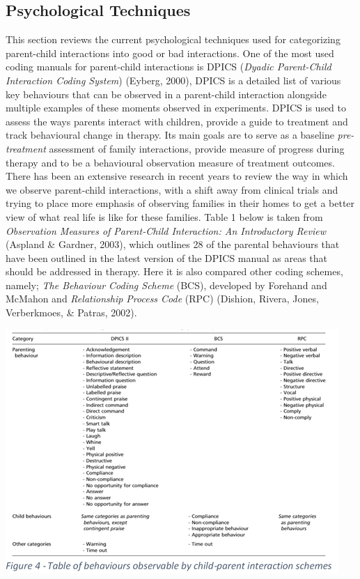 \documentclass[a4paper,11pt]{report}
\begin{document}
\subsection{Psychological Techniques}
This section reviews the current psychological techniques used for categorizing parent-child interactions into good or bad interactions. One of the most used coding manuals for parent-child interactions is DPICS (\textit{Dyadic Parent-Child Interaction Coding System}) (Eyberg, 2000), DPICS is a detailed list of various key behaviours that can be observed in a parent-child interaction alongside multiple examples of these moments observed in experiments. DPICS is used to assess the ways parents interact with children, provide a guide to treatment and track behavioural change in therapy. Its main goals are to serve as a baseline \textit{pre-treatment} assessment of family interactions, provide measure of progress during therapy and to be a behavioural observation measure of treatment outcomes. There has been an extensive research in recent years to review the way in which we observe parent-child interactions, with a shift away from clinical trials and trying to place more emphasis of observing families in their homes to get a better view of what real life is like for these families. Table 1 below is taken from \textit{Observation Measures of Parent-Child Interaction: An Introductory Review} (Aspland \& Gardner, 2003), which outlines 28 of the parental behaviours that have been outlined in the latest version of the DPICS manual as areas that should be addressed in therapy. Here it is also compared other coding schemes, namely; \textit{The Behaviour Coding Scheme} (BCS), developed by Forehand and McMahon and \textit{Relationship Process Code} (RPC) (Dishion, Rivera, Jones, Verberkmoes, \& Patras, 2002).\\

\begin{center}
\includegraphics{ParentalCodingSystems.PNG}
\end{center}
\end{document}
